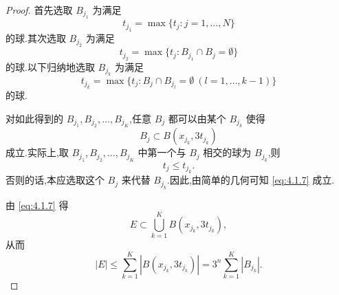 \begin{proof}
首先选取 $B_{j_{1}}$ 为满足
\begin{equation*}
t_{j_{1}} = \max\{t_{j}: j = 1, \ldots, N\}
\end{equation*}
的球.其次选取 $B_{j_{2}}$ 为满足
\begin{equation*}
t_{j_{2}} = \max\{t_{j}: B_{j_{1}} \cap B_{j} = \emptyset\}
\end{equation*}
的球.以下归纳地选取 $B_{j_{k}}$ 为满足
\begin{equation*}
t_{j_{k}} = \max\{t_{j}: B_{j} \cap B_{j_{l}} = \emptyset \ (l = 1, \ldots, k-1)\}
\end{equation*}
的球.

对如此得到的 $B_{j_{1}}, B_{j_{2}}, \ldots, B_{j_{K}}$,任意 $B_{j}$ 都可以由某个 $B_{j_{k}}$ 使得
\begin{equation}
B_{j} \subset B(x_{j_{k}}, 3t_{j_{k}})\tag{4.1.7}
\label{eq:4.1.7}\end{equation}
成立.实际上,取 $B_{j_{1}}, B_{j_{2}}, \ldots, B_{j_{K}}$ 中第一个与 $B_{j}$ 相交的球为 $B_{j_{k}}$,则
\begin{equation*}
t_{j} \leq t_{j_{k}}.
\end{equation*}
否则的话,本应选取这个 $B_{j}$ 来代替 $B_{j_{k}}$.因此,由简单的几何可知 \eqref{eq:4.1.7} 成立.

由 \eqref{eq:4.1.7} 得
\begin{equation*}
E \subset \bigcup_{k=1}^{K}B(x_{j_{k}}, 3t_{j_{k}}),
\end{equation*}
从而
\begin{equation*}
|E| \leq \sum_{k=1}^{K}|B(x_{j_{k}}, 3t_{j_{k}})| = 3^{n}\sum_{k=1}^{K}|B_{j_{k}}|.
\end{equation*}
\end{proof}

